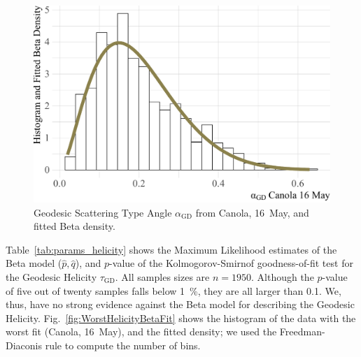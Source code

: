 \documentclass[journal]{IEEEtran}
\begin{document}
\begin{figure}[hbt]
\centering
\includegraphics[width=\linewidth]{CanolaAlphaBetaFit}
\caption{Geodesic Scattering Type Angle $\alpha_{\text{GD}}$ from Canola, 16~May, and fitted Beta density.}\label{fig:WorstAlphaBetaFit}
\end{figure}

Table~\ref{tab:params_helicity} shows the Maximum Likelihood estimates of the Beta model ($\widehat p,\widehat q$), and $p$-value of the Kolmogorov-Smirnof goodness-of-fit test for the Geodesic Helicity $\tau_{\text{GD}}$.
All samples sizes are $n=1950$.
Although the $p$-value of five out of twenty samples falls below \SI{1}{\percent}, they are all larger than \SI{0.1}{\permille}.
We, thus, have no strong evidence against the Beta model for describing the Geodesic Helicity.
Fig.~\ref{fig:WorstHelicityBetaFit} shows the histogram of the data with the worst fit (Canola, 16~May), and the fitted density; we used the Freedman-Diaconis rule to compute the number of bins.
\end{document}
